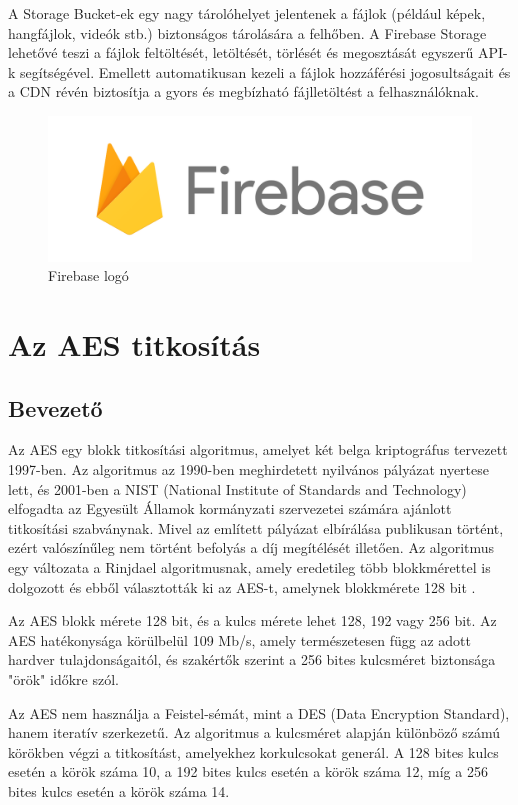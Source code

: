 A Storage Bucket-ek egy nagy tárolóhelyet jelentenek a fájlok (például képek, hangfájlok, videók stb.) biztonságos tárolására a felhőben. A Firebase Storage lehetővé teszi a fájlok feltöltését, letöltését, törlését és megosztását egyszerű API-k segítségével. Emellett automatikusan kezeli a fájlok hozzáférési jogosultságait és a CDN révén biztosítja a gyors és megbízható fájlletöltést a felhasználóknak.

\begin{figure}[!h]
	\centering
	\includegraphics[scale=0.1]{images/firebaseLogo}
	\caption{Firebase logó}
	\label{abra:firebaseLogo}
\end{figure}

\section {Az AES titkosítás}
\subsection {Bevezető}

Az AES egy blokk titkosítási algoritmus, amelyet két belga kriptográfus tervezett 1997-ben. Az algoritmus az 1990-ben meghirdetett nyilvános pályázat nyertese lett, és 2001-ben a NIST (National Institute of Standards and Technology) elfogadta az Egyesült Államok kormányzati szervezetei számára ajánlott titkosítási szabványnak. Mivel az említett pályázat elbírálása publikusan történt, ezért valószínűleg nem történt befolyás a díj megítélését illetően. Az algoritmus egy változata a Rinjdael algoritmusnak, amely eredetileg több blokkmérettel is dolgozott és ebből választották ki az AES-t, amelynek blokkmérete 128 bit \cite{AES}.

Az AES blokk mérete 128 bit, és a kulcs mérete lehet 128, 192 vagy 256 bit. Az AES hatékonysága körülbelül 109 Mb/s, amely természetesen függ az adott hardver tulajdonságaitól, és szakértők szerint a 256 bites kulcsméret biztonsága "örök" időkre szól.

Az AES nem használja a Feistel-sémát, mint a DES (Data Encryption Standard), hanem iteratív szerkezetű. Az algoritmus a kulcsméret alapján különböző számú körökben végzi a titkosítást, amelyekhez korkulcsokat generál. A 128 bites kulcs esetén a körök száma 10, a 192 bites kulcs esetén a körök száma 12, míg a 256 bites kulcs esetén a körök száma 14.

